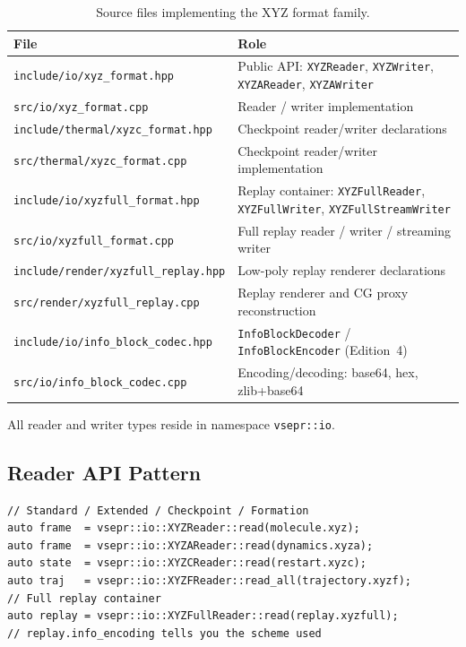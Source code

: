 \documentclass[12pt, a4paper, oneside]{article}
\newcommand{\file}[1]{\texttt{#1}}
\newcommand{\type}[1]{\texttt{#1}}
\begin{document}
\begin{table}[htbp]
  \centering
  \caption{Source files implementing the XYZ format family.}
  \label{tab:impl}
  \begin{tabular}{lp{8.5cm}}
    \toprule
    File & Role \\
    \midrule
    \file{include/io/xyz\_format.hpp}
      & Public API: \type{XYZReader}, \type{XYZWriter}, \type{XYZAReader}, \type{XYZAWriter} \\
    \file{src/io/xyz\_format.cpp}
      & Reader / writer implementation \\
    \file{include/thermal/xyzc\_format.hpp}
      & Checkpoint reader/writer declarations \\
    \file{src/thermal/xyzc\_format.cpp}
      & Checkpoint reader/writer implementation \\
    \file{include/io/xyzfull\_format.hpp}
      & Replay container: \type{XYZFullReader}, \type{XYZFullWriter}, \type{XYZFullStreamWriter} \\
    \file{src/io/xyzfull\_format.cpp}
      & Full replay reader / writer / streaming writer \\
    \file{include/render/xyzfull\_replay.hpp}
      & Low-poly replay renderer declarations \\
    \file{src/render/xyzfull\_replay.cpp}
      & Replay renderer and CG proxy reconstruction \\
    \file{include/io/info\_block\_codec.hpp}
      & \type{InfoBlockDecoder} / \type{InfoBlockEncoder} (Edition~4) \\
    \file{src/io/info\_block\_codec.cpp}
      & Encoding/decoding: base64, hex, zlib+base64 \\
    \bottomrule
  \end{tabular}
\end{table}

All reader and writer types reside in namespace \type{vsepr::io}.

\subsection{Reader API Pattern}

\begin{lstlisting}
// Standard / Extended / Checkpoint / Formation
auto frame  = vsepr::io::XYZReader::read(molecule.xyz);
auto frame  = vsepr::io::XYZAReader::read(dynamics.xyza);
auto state  = vsepr::io::XYZCReader::read(restart.xyzc);
auto traj   = vsepr::io::XYZFReader::read_all(trajectory.xyzf);
// Full replay container
auto replay = vsepr::io::XYZFullReader::read(replay.xyzfull);
// replay.info_encoding tells you the scheme used
\end{lstlisting}
\end{document}
